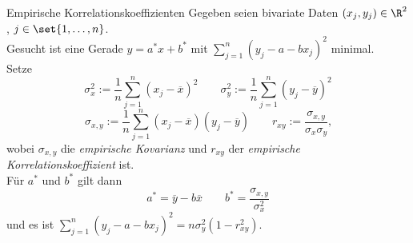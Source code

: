 \begin{karte}{Empirische Korrelationskoeffizienten}
	Gegeben seien bivariate Daten $(x_j,y_j) \in \R^2$, $j \in \set{1,\dotsc,n}$. \\
	Gesucht ist eine Gerade $y=a^{\ast}x+b^{\ast}$ mit $\displaystyle \sum_{j=1}^{n} (y_j-a-bx_j)^2$ minimal. \\
	Setze 
	\[\sigma_x^2 := \frac{1}{n} \sum_{j=1}^{n} (x_j-\overline{x})^2 \qquad \sigma_y^2 := \frac{1}{n} \sum_{j=1}^{n} (y_j-\overline{y})^2\] \[\sigma_{x,y} := \frac{1}{n} \sum_{j=1}^{n} (x_j-\overline{x})(y_j-\overline{y}) \qquad r_{xy} :=\frac{\sigma_{x,y}}{\sigma_x \sigma_y} \text{,}\]
	wobei $\sigma_{x,y}$ die \textit{empirische Kovarianz} und $r_{xy}$ der \textit{empirische Korrelationskoeffizient} ist. \\
	Für $a^\ast$ und $b^\ast$ gilt dann
	\[a^\ast = \overline{y}-b\overline{x} \qquad b^\ast = \frac{\sigma_{x,y}}{\sigma_x^2}\] und es ist
	$\displaystyle \sum_{j=1}^{n} (y_j-a-bx_j)^2 = n\sigma_y^2(1-r_{xy}^2)$.
	
\end{karte}
